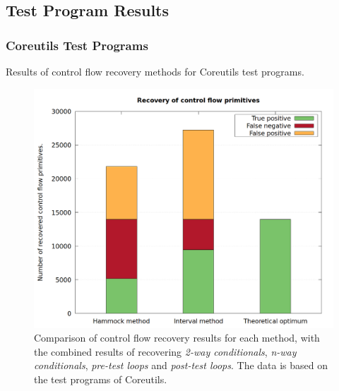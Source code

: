 
\subsection{Test Program Results}
\label{app:test_program_results}


\subsubsection{Coreutils Test Programs}
\label{app:coreutils_test_programs}

Results of control flow recovery methods for Coreutils test programs.

\begin{figure}[htbp]
	\centering
	\includegraphics[width=\textwidth]{inc/appendices/test_program_results/coreutils/results_combined.png}
	\caption{Comparison of control flow recovery results for each method, with the combined results of recovering \textit{2-way conditionals}, \textit{n-way conditionals}, \textit{pre-test loops} and \textit{post-test loops}. The data is based on the test programs of Coreutils.}
	\label{fig:coreutils_results_combined}
\end{figure}


